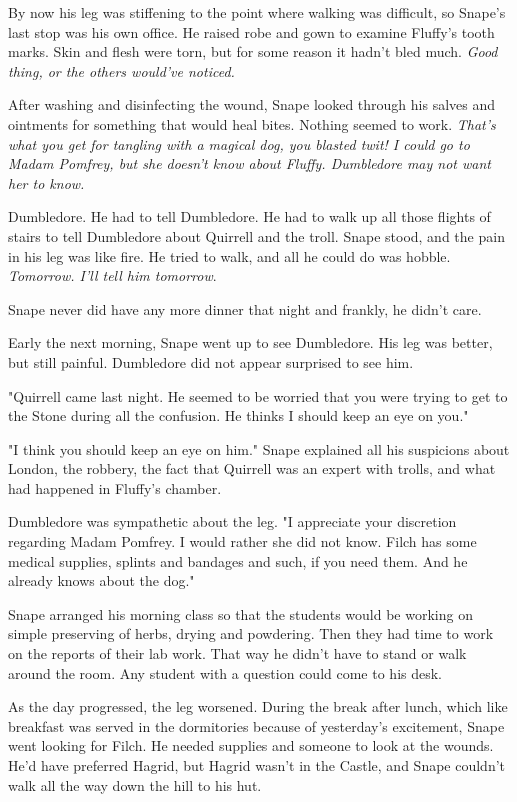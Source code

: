 By now his leg was stiffening to the point where walking was difficult, so Snape's last stop was his own office. He raised robe and gown to examine Fluffy's tooth marks. Skin and flesh were torn, but for some reason it hadn't bled much. \emph{Good thing, or the others would've noticed.}

After washing and disinfecting the wound, Snape looked through his salves and ointments for something that would heal bites. Nothing seemed to work. \emph{That's what you get for tangling with a magical dog, you blasted twit! I could go to Madam Pomfrey, but she doesn't know about Fluffy. Dumbledore may not want her to know.}

Dumbledore. He had to tell Dumbledore. He had to walk up all those flights of stairs to tell Dumbledore about Quirrell and the troll. Snape stood, and the pain in his leg was like fire. He tried to walk, and all he could do was hobble. \emph{Tomorrow. I'll tell him tomorrow}.

Snape never did have any more dinner that night and frankly, he didn't care.

Early the next morning, Snape went up to see Dumbledore. His leg was better, but still painful. Dumbledore did not appear surprised to see him.

"Quirrell came last night. He seemed to be worried that you were trying to get to the Stone during all the confusion. He thinks I should keep an eye on you."

"I think you should keep an eye on him." Snape explained all his suspicions about London, the robbery, the fact that Quirrell was an expert with trolls, and what had happened in Fluffy's chamber.

Dumbledore was sympathetic about the leg. "I appreciate your discretion regarding Madam Pomfrey. I would rather she did not know. Filch has some medical supplies, splints and bandages and such, if you need them. And he already knows about the dog."

Snape arranged his morning class so that the students would be working on simple preserving of herbs, drying and powdering. Then they had time to work on the reports of their lab work. That way he didn't have to stand or walk around the room. Any student with a question could come to his desk.

As the day progressed, the leg worsened. During the break after lunch, which like breakfast was served in the dormitories because of yesterday's excitement, Snape went looking for Filch. He needed supplies and someone to look at the wounds. He'd have preferred Hagrid, but Hagrid wasn't in the Castle, and Snape couldn't walk all the way down the hill to his hut.


